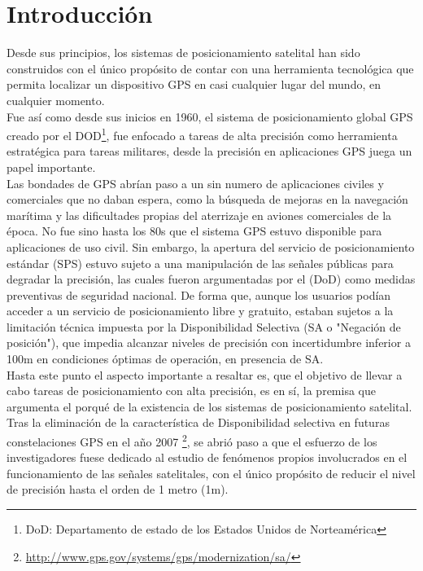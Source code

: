 \chapter{Introducción}
\label{sec:introduccion}

Desde sus principios, los sistemas de posicionamiento satelital han sido construidos con el único propósito de contar con una herramienta tecnológica que permita localizar un dispositivo GPS en casi cualquier lugar del mundo, en cualquier momento.\\ 

Fue así como desde sus inicios en 1960, el sistema de posicionamiento global GPS creado por el DOD\footnote{DoD: Departamento de estado de los Estados Unidos de Norteamérica}, fue enfocado a tareas de alta precisión como herramienta estratégica para tareas militares, desde la precisión en aplicaciones GPS juega un papel importante.\\

Las bondades de GPS abrían paso a un sin numero de aplicaciones civiles y comerciales que no daban espera, como la búsqueda de mejoras en la navegación marítima y las dificultades propias del aterrizaje en aviones comerciales de la época. No fue sino hasta los 80s que el sistema GPS estuvo disponible para aplicaciones de uso civil. Sin embargo, la apertura del servicio de posicionamiento estándar (SPS) estuvo sujeto a una manipulación de las señales públicas para degradar la precisión, las cuales fueron argumentadas por el (DoD) como medidas preventivas de seguridad nacional. De forma que, aunque los usuarios podían acceder a un servicio de posicionamiento libre y gratuito, estaban sujetos a la limitación técnica impuesta por la Disponibilidad Selectiva (SA o "Negación de posición"), que impedia alcanzar niveles de precisión con incertidumbre inferior a 100m en condiciones óptimas de operación, en presencia de SA.\\ 

Hasta este punto el aspecto importante a resaltar es, que el objetivo de llevar a cabo tareas de posicionamiento con alta precisión, es en sí, la premisa que argumenta el porqué de la existencia de los sistemas de posicionamiento satelital.\\ 

Tras la eliminación de la característica de Disponibilidad selectiva en futuras constelaciones GPS en el año 2007 \footnote{\url{http://www.gps.gov/systems/gps/modernization/sa/}}, se abrió paso a que el esfuerzo de los investigadores fuese dedicado al estudio de fenómenos propios involucrados en el funcionamiento de las señales satelitales, con el único propósito de reducir el nivel de precisión hasta el orden de 1 metro (1m).\\

